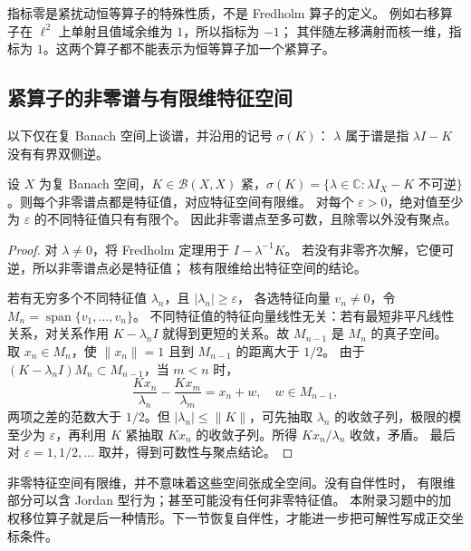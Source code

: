 \ProseParagraphBreak

指标零是紧扰动恒等算子的特殊性质，不是 Fredholm 算子的定义。
例如右移算子在 \(\ell^2\) 上单射且值域余维为 \(1\)，所以指标为 \(-1\)；
其伴随左移满射而核一维，指标为 \(1\)。这两个算子都不能表示为恒等算子加一个紧算子。

\subsection{紧算子的非零谱与有限维特征空间}
\label{b1:subsec:C10404}

以下仅在复 Banach 空间上谈谱，并沿用的记号 \(\sigma(K)\)：
\(\lambda\) 属于谱是指 \(\lambda I-K\) 没有有界双侧逆。

\begin{corollary}[紧算子的非零谱]\label{b1:cor:C1-compact-nonzero-spectrum}
设 \(X\) 为复 Banach 空间，\(K\in\mathcal B(X,X)\) 紧，\(\sigma(K)=\{\lambda\in\mathbb C:\lambda I_X-K\text{ 不可逆}\}\)。则每个非零谱点都是特征值，对应特征空间有限维。
对每个 \(\varepsilon>0\)，绝对值至少为 \(\varepsilon\) 的不同特征值只有有限个。
因此非零谱点至多可数，且除零以外没有聚点。
\end{corollary}
\begin{proof}
对 \(\lambda\ne0\)，将 Fredholm 定理用于 \(I-\lambda^{-1}K\)。
若没有非零齐次解，它便可逆，所以非零谱点必是特征值；
核有限维给出特征空间的结论。

若有无穷多个不同特征值 \(\lambda_n\)，且 \(|\lambda_n|\geq\varepsilon\)，
各选特征向量 \(v_n\ne0\)，令 \(M_n=\operatorname{span}\{v_1,\ldots,v_n\}\)。
不同特征值的特征向量线性无关：若有最短非平凡线性关系，对关系作用
\(K-\lambda_nI\) 就得到更短的关系。故 \(M_{n-1}\) 是 \(M_n\) 的真子空间。
取 \(x_n\in M_n\)，使 \(\|x_n\|=1\) 且到 \(M_{n-1}\) 的距离大于 \(1/2\)。
由于 \((K-\lambda_nI)M_n\subset M_{n-1}\)，当 \(m<n\) 时，
\[
 \frac{Kx_n}{\lambda_n}-\frac{Kx_m}{\lambda_m}
 =x_n+w,\quad w\in M_{n-1},
\]
两项之差的范数大于 \(1/2\)。但 \(|\lambda_n|\leq\|K\|\)，可先抽取
\(\lambda_n\) 的收敛子列，极限的模至少为 \(\varepsilon\)，再利用 \(K\) 紧抽取
\(Kx_n\) 的收敛子列。所得 \(Kx_n/\lambda_n\) 收敛，矛盾。
最后对 \(\varepsilon=1,1/2,\ldots\) 取并，得到可数性与聚点结论。
\end{proof}

非零特征空间有限维，并不意味着这些空间张成全空间。没有自伴性时，
有限维部分可以含 Jordan 型行为；甚至可能没有任何非零特征值。
本附录习题中的加权移位算子就是后一种情形。下一节恢复自伴性，才能进一步把可解性写成正交坐标条件。
